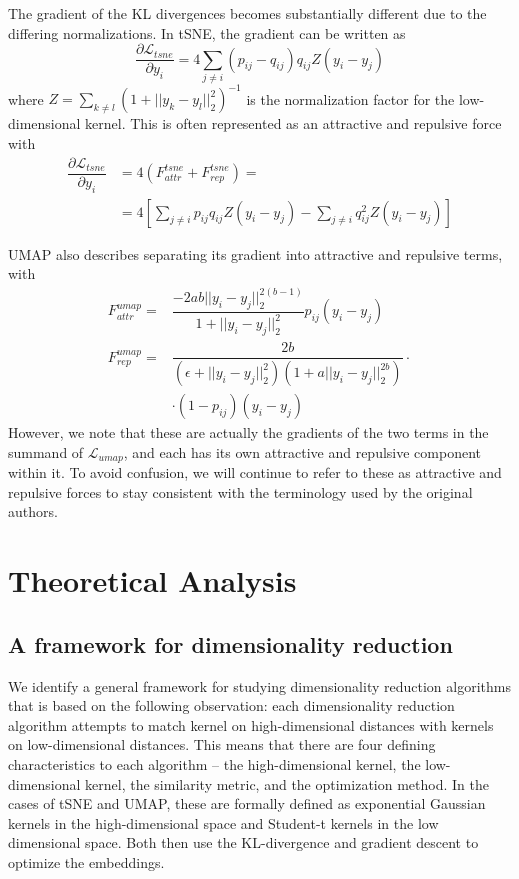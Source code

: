 \documentclass{article}
\theoremstyle{definition}
\begin{document}
\begin{multicols}{2}
The gradient of the KL divergences becomes substantially different due to the differing normalizations. In tSNE, the gradient can be written as
\begin{equation}
    \dfrac{\partial \mathcal{L}_{tsne}}{\partial y_i} = 4 \sum_{j \neq i} (p_{ij} - q_{ij}) q_{ij} Z (y_i - y_j)
\end{equation}
where $Z = \sum_{k \neq l} (1 + ||y_k - y_l||_2^2)^{-1}$ is the normalization factor for the low-dimensional kernel. This is often represented as an attractive
and repulsive force with
\begin{align*}
    \dfrac{\partial \mathcal{L}_{tsne}}{\partial y_i} &= 4(F^{tsne}_{attr} + F^{tsne}_{rep}) = \\
    &= 4 \left[ \sum_{j \neq i} p_{ij}q_{ij}Z (y_i - y_j) - \sum_{j \neq i} q_{ij}^2
Z (y_i - y_j) \right]
\end{align*}

UMAP also describes separating its gradient into attractive and repulsive terms, with
\begin{align}
    F_{attr}^{umap} = &\dfrac{-2ab||y_i - y_j||_2^{2(b-1)}}{1 + ||y_i - y_j||_2^2} p_{ij} (y_i - y_j) \\
    F_{rep}^{umap} = &\dfrac{2b}{(\epsilon + ||y_i - y_j||_2^2)(1 + a ||y_i - y_j||_2^{2b})} \cdot \\
    &\cdot (1 - p_{ij}) (y_i - y_j) \label{umap_rep}
\end{align}
However, we note that these are actually the gradients of the two terms in the summand of $\mathcal{L}_{umap}$, and each has its own attractive and repulsive
component within it. To avoid confusion, we will continue to refer to these as attractive and repulsive forces to stay consistent with the terminology used by
the original authors.

\section{Theoretical Analysis}
\subsection{A framework for dimensionality reduction}
We identify a general framework for studying dimensionality reduction algorithms that is based on the following observation: each dimensionality reduction
algorithm attempts to match kernel on high-dimensional distances with kernels on low-dimensional distances. This means that there are four defining
characteristics to each algorithm -- the high-dimensional kernel, the low-dimensional kernel, the similarity metric, and the optimization method. In the cases of tSNE and UMAP, these
are formally defined as exponential Gaussian kernels in the high-dimensional space and Student-t kernels in the low dimensional space. Both then use the
KL-divergence and gradient descent to optimize the embeddings.


\end{multicols}
\end{document}
